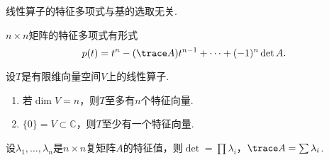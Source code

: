   \begin{thm}
    线性算子的特征多项式与基的选取无关.
  \end{thm}

  \begin{thm}
    $n\times n$矩阵的特征多项式有形式
    \[
      p(t) = t^n - (\trace A)t^{n-1} + \cdots + (-1)^n\det A.
    \]
  \end{thm}

  \begin{thm}
    设$T$是有限维向量空间$V$上的线性算子.
    \begin{enumerate}
      \item 若$\dim V=n$，则$T$至多有$n$个特征向量.
      \item $\{0\}=V\subset\mathbb{C}$，则$T$至少有一个特征向量.
    \end{enumerate}
  \end{thm}

  \begin{thm}
    设$\lambda_1,\dots,\lambda_n$是$n\times n$复矩阵$A$的特征值，则$\det=
    \prod\lambda_i$，$\trace A=\sum\lambda_i$.
  \end{thm}




